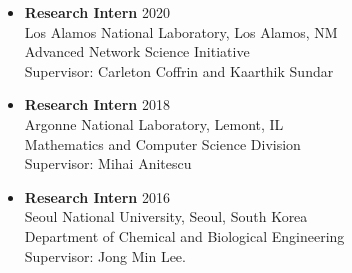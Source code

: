 \documentclass[letterpaper, 11pt]{article}
\begin{document}
\begin{itemize}[leftmargin=*]
\item[] {\bf Research Intern} \hfill 2020\\
  Los Alamos National Laboratory, Los Alamos, NM \\
  Advanced Network Science Initiative\\
  Supervisor: Carleton Coffrin and Kaarthik Sundar
\item[] {\bf Research Intern} \hfill 2018\\
  Argonne National Laboratory, Lemont, IL \\
  Mathematics and Computer Science Division \\
  Supervisor: Mihai Anitescu
\item[] {\bf Research Intern} \hfill 2016\\
  Seoul National University, Seoul, South Korea \\
  Department of Chemical and Biological Engineering\\
  Supervisor: Jong Min Lee.
\end{itemize}
\end{document}
